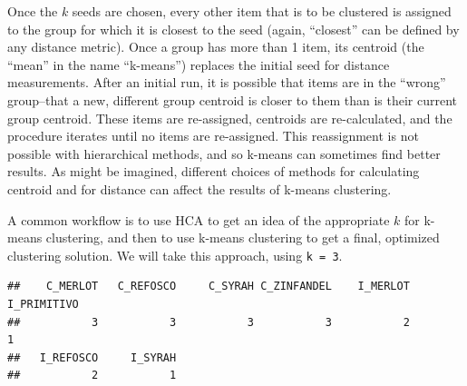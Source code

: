 \documentclass[
]{book}
\newenvironment{Shaded}{\begin{snugshade}}{\end{snugshade}}
\newcommand{\AttributeTok}[1]{\textcolor[rgb]{0.13,0.29,0.53}{#1}}
\newcommand{\DecValTok}[1]{\textcolor[rgb]{0.00,0.00,0.81}{#1}}
\newcommand{\FunctionTok}[1]{\textcolor[rgb]{0.13,0.29,0.53}{\textbf{#1}}}
\newcommand{\NormalTok}[1]{#1}
\newcommand{\OtherTok}[1]{\textcolor[rgb]{0.56,0.35,0.01}{#1}}
\newcommand{\SpecialCharTok}[1]{\textcolor[rgb]{0.81,0.36,0.00}{\textbf{#1}}}
\newcommand{\StringTok}[1]{\textcolor[rgb]{0.31,0.60,0.02}{#1}}
\begin{document}
Once the \(k\) seeds are chosen, every other item that is to be clustered is assigned to the group for which it is closest to the seed (again, ``closest'' can be defined by any distance metric). Once a group has more than 1 item, its centroid (the ``mean'' in the name ``k-means'') replaces the initial seed for distance measurements. After an initial run, it is possible that items are in the ``wrong'' group--that a new, different group centroid is closer to them than is their current group centroid. These items are re-assigned, centroids are re-calculated, and the procedure iterates until no items are re-assigned. This reassignment is not possible with hierarchical methods, and so k-means can sometimes find better results. As might be imagined, different choices of methods for calculating centroid and for distance can affect the results of k-means clustering.

A common workflow is to use HCA to get an idea of the appropriate \(k\) for k-means clustering, and then to use k-means clustering to get a final, optimized clustering solution. We will take this approach, using \texttt{k\ =\ 3}.

\begin{Shaded}
\end{Shaded}

\begin{verbatim}
##    C_MERLOT   C_REFOSCO     C_SYRAH C_ZINFANDEL    I_MERLOT I_PRIMITIVO 
##           3           3           3           3           2           1 
##   I_REFOSCO     I_SYRAH 
##           2           1
\end{verbatim}

\begin{Shaded}
\end{Shaded}
\end{document}
